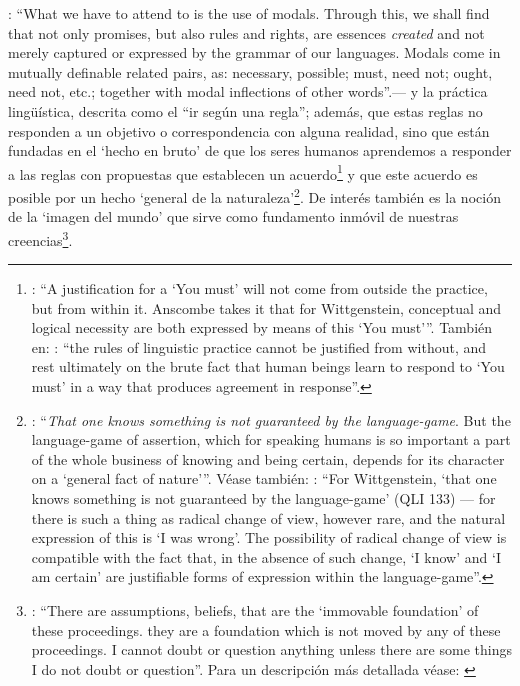 {\cite[Cf.][100]{anscombe1981erp:rrp}: \enquote{What we have to attend to is the use of modals. Through this, we shall find that not only promises, but also rules and rights, are essences \emph{created} and not merely captured or expressed by the grammar of our languages. Modals come in mutually definable related pairs, as: necessary, possible; must, need not; ought, need not, etc.; together with modal inflections of other words}.}--- y la práctica lingüística, descrita como el ``ir según una regla''; además, que estas reglas no responden a un objetivo o correspondencia con alguna realidad, sino que están fundadas en el `hecho en bruto' de que los seres humanos aprendemos a responder a las reglas con propuestas que establecen un acuerdo\footnote{\Cite[Cf.][219]{teichmann2008ans}: \enquote{A justification for a `You must' will not come from outside the practice, but from within it. Anscombe takes it that for Wittgenstein, conceptual and logical necessity are both expressed by means of this `You must'}. También en: \Cite[Cf.][220]{teichmann2008ans}: \enquote{the rules of linguistic practice cannot be justified from without, and rest ultimately on the brute fact that human beings learn to respond to `You must' in a way that produces agreement in response}.} y que este acuerdo es posible por un hecho `general de la naturaleza'\footnote{\Cite[Cf.][133]{anscombe1981parmenides:qli}: \enquote{\emph{That one knows something is not guaranteed by the language-game}. \textelp{} But the language-game of assertion, which for speaking humans is so important a part of the whole business of knowing and being certain, depends for its character on a `general fact of nature'}. Véase también: \Cite[Cf.][224]{teichmann2008ans}: \enquote{For Wittgenstein, `that one knows something is not guaranteed by the language-game' (QLI 133) --- for there is such a thing as radical change of view, however rare, and the natural expression of this is `I was wrong'. The possibility of radical change of view is compatible with the fact that, in the absence of such change, `I know' and `I am certain' are justifiable forms of expression within the language-game}.}. De interés también es la noción de la `imagen del mundo' que sirve como fundamento inmóvil de nuestras creencias\footnote{\Cite[130]{anscombe1981parmenides:qli}: \enquote{There are assumptions, beliefs, that are the `immovable foundation' of these proceedings. \textelp{} they are a foundation which is not moved by any of these proceedings. I cannot doubt or question anything unless there are some things I do not doubt or question}. Para un descripción más detallada véase: \Cite[\S95-99]{wittgenstein1969oncertes}}.

